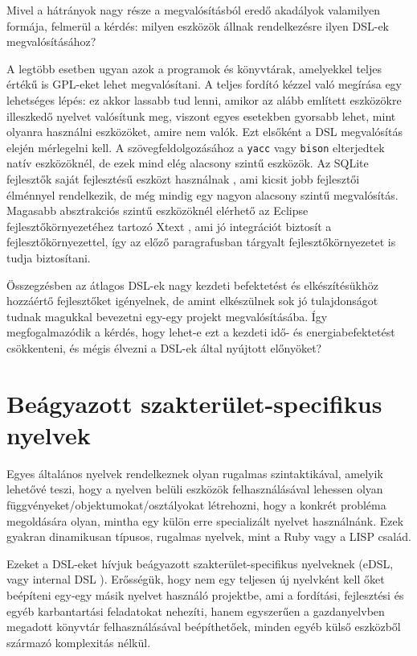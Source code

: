Mivel a hátrányok nagy része a megvalósításból eredő akadályok valamilyen formája, felmerül a kérdés: milyen eszközök állnak rendelkezésre ilyen \gls{DSL}-ek megvalósításához?

A legtöbb esetben ugyan azok a programok és könyvtárak, amelyekkel teljes értékű is \gls{GPL}-eket lehet megvalósítani.
A teljes fordító kézzel való megírása egy lehetséges lépés: ez akkor lassabb tud lenni, amikor az alább említett eszközökre illeszkedő nyelvet valósítunk meg, viszont egyes esetekben gyorsabb lehet, mint olyanra használni eszközöket, amire nem valók.
Ezt elsőként a \gls{DSL} megvalósítás elején mérlegelni kell.
A szövegfeldolgozásához a {\tt yacc} vagy {\tt bison} \cite{freesoftwarefoundationinc.BisonGNUProject1988} elterjedtek natív eszközöknél, de ezek mind elég alacsony szintű eszközök.
Az SQLite fejlesztők saját fejlesztésű eszközt használnak \cite{hippwyrick&companyinc.LEMONParserGenerator2025}, ami kicsit jobb fejlesztői élménnyel rendelkezik, de még mindig egy nagyon alacsony szintű megvalósítás.
Magasabb absztrakciós szintű eszközöknél elérhető az Eclipse fejlesztőkörnyezetéhez tartozó Xtext \cite{eclisefoundationXtextLanguageEngineering2025}, ami jó integrációt biztosít a fejlesztőkörnyezettel, így az előző paragrafusban tárgyalt fejlesztőkörnyezetet is tudja biztosítani.

Összegzésben az átlagos \gls{DSL}-ek nagy kezdeti befektetést és elkészítésükhöz hozzáértő fejlesztőket igényelnek, de amint elkészülnek sok jó tulajdonságot tudnak magukkal bevezetni egy-egy projekt megvalósításába.
Így megfogalmazódik a kérdés, hogy lehet-e ezt a kezdeti idő- és energiabefektetést csökkenteni, és mégis élvezni a \gls{DSL}-ek által nyújtott előnyöket?

\section{Beágyazott szakterület-specifikus nyelvek}\label{chr:dsl:edsl}

Egyes általános nyelvek rendelkeznek olyan rugalmas szintaktikával, amelyik lehetővé teszi, hogy a nyelven belüli eszközök felhasználásával lehessen olyan függvényeket/objektumokat/osztályokat létrehozni, hogy a konkrét probléma megoldására olyan, mintha egy külön erre specializált nyelvet használnánk.
Ezek gyakran dinamikusan típusos, rugalmas nyelvek, mint a Ruby vagy a LISP család.

Ezeket a \gls{DSL}-eket hívjuk beágyazott szakterület-specifikus nyelveknek (\gls{eDSL}, vagy internal \gls{DSL} \cite{fowlerBlikiInternalDsl2006}).
Erősségük, hogy nem egy teljesen új nyelvként kell őket beépíteni egy-egy másik nyelvet használó projektbe, ami a fordítási, fejlesztési és egyéb karbantartási feladatokat nehezíti, hanem egyszerűen a gazdanyelvben megadott könyvtár felhasználásával beépíthetőek, minden egyéb külső eszközből származó komplexitás nélkül.

